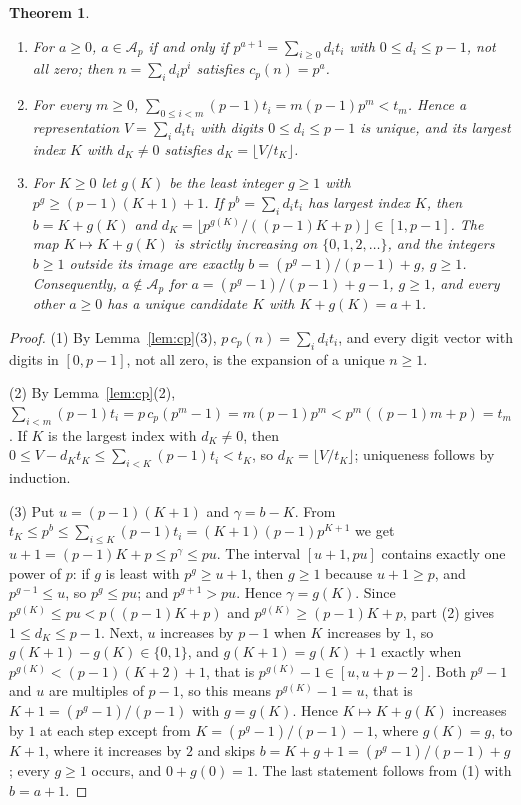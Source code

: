 \documentclass[11pt]{amsart}
\newtheorem{Theorem}{Theorem}[section]
\theoremstyle{definition}
\begin{document}
\begin{Theorem}
\label{thm:primes}
\begin{enumerate}
\item For $a\ge0$, $a\in\mathcal{A}_p$ if and only if $p^{a+1}=\sum_{i\ge0}d_it_i$ with $0\le d_i\le p-1$, not all zero; then $n=\sum_id_ip^i$ satisfies $c_p(n)=p^a$.
\item For every $m\ge0$, $\sum_{0\le i<m}(p-1)t_i=m(p-1)p^m<t_m$. Hence a representation $V=\sum_id_it_i$ with digits $0\le d_i\le p-1$ is unique, and its largest index $K$ with $d_K\neq0$ satisfies $d_K=\lfloor V/t_K\rfloor$.
\item For $K\ge0$ let $g(K)$ be the least integer $g\ge1$ with $p^g\ge(p-1)(K+1)+1$. If $p^{b}=\sum_id_it_i$ has largest index $K$, then $b=K+g(K)$ and $d_K=\lfloor p^{g(K)}/((p-1)K+p)\rfloor\in[1,p-1]$. The map $K\mapsto K+g(K)$ is strictly increasing on $\{0,1,2,\dots\}$, and the integers $b\ge1$ outside its image are exactly $b=(p^g-1)/(p-1)+g$, $g\ge1$. Consequently, $a\notin\mathcal{A}_p$ for $a=(p^g-1)/(p-1)+g-1$, $g\ge1$, and every other $a\ge0$ has a unique candidate $K$ with $K+g(K)=a+1$.
\end{enumerate}
\end{Theorem}
\begin{proof}
(1) By Lemma~\ref{lem:cp}(3), $p\,c_p(n)=\sum_id_it_i$, and every digit vector with digits in $[0,p-1]$, not all zero, is the expansion of a unique $n\ge1$.

(2) By Lemma~\ref{lem:cp}(2), $\sum_{i<m}(p-1)t_i=p\,c_p(p^m-1)=m(p-1)p^m<p^m((p-1)m+p)=t_m$. If $K$ is the largest index with $d_K\neq0$, then $0\le V-d_Kt_K\le\sum_{i<K}(p-1)t_i<t_K$, so $d_K=\lfloor V/t_K\rfloor$; uniqueness follows by induction.

(3) Put $u=(p-1)(K+1)$ and $\gamma=b-K$. From $t_K\le p^b\le\sum_{i\le K}(p-1)t_i=(K+1)(p-1)p^{K+1}$ we get $u+1=(p-1)K+p\le p^\gamma\le pu$. The interval $[u+1,pu]$ contains exactly one power of $p$: if $g$ is least with $p^g\ge u+1$, then $g\ge1$ because $u+1\ge p$, and $p^{g-1}\le u$, so $p^g\le pu$; and $p^{g+1}>pu$. Hence $\gamma=g(K)$. Since $p^{g(K)}\le pu<p((p-1)K+p)$ and $p^{g(K)}\ge(p-1)K+p$, part (2) gives $1\le d_K\le p-1$. Next, $u$ increases by $p-1$ when $K$ increases by $1$, so $g(K+1)-g(K)\in\{0,1\}$, and $g(K+1)=g(K)+1$ exactly when $p^{g(K)}<(p-1)(K+2)+1$, that is $p^{g(K)}-1\in[u,u+p-2]$. Both $p^{g}-1$ and $u$ are multiples of $p-1$, so this means $p^{g(K)}-1=u$, that is $K+1=(p^{g}-1)/(p-1)$ with $g=g(K)$. Hence $K\mapsto K+g(K)$ increases by $1$ at each step except from $K=(p^g-1)/(p-1)-1$, where $g(K)=g$, to $K+1$, where it increases by $2$ and skips $b=K+g+1=(p^g-1)/(p-1)+g$; every $g\ge1$ occurs, and $0+g(0)=1$. The last statement follows from (1) with $b=a+1$.
\end{proof}
\end{document}

